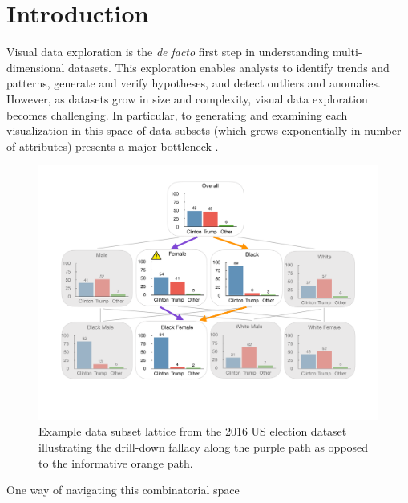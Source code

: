 \section{Introduction}


\par Visual data exploration is the {\em de facto} first step in understanding multi-dimensional datasets. This exploration enables analysts to identify trends and patterns, generate and verify hypotheses, and detect outliers and anomalies. However, as datasets grow in size and complexity, visual data exploration becomes challenging. In particular, to 
generating and examining each visualization 
in this space of data subsets 
(which grows exponentially in number of attributes) presents a major bottleneck .
\begin{figure}[ht!]
\includegraphics[width=0.95\linewidth]{figures/elections_example_lattice_teaser.pdf}
\caption{Example data subset lattice from the 2016 US election dataset illustrating the drill-down fallacy along the purple path as opposed to the informative orange path.}
\label{fig:elections_example}
\vspace{-10pt}
\end{figure}
\par One way of navigating this combinatorial space 
